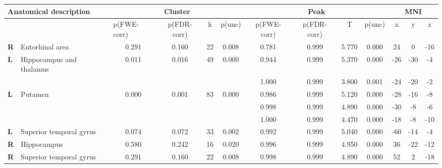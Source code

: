 \begin{landscape}
\begin{table}[!ht]
    \vspace*{-4cm}
    \raggedright
\begin{tabular}{ll|cccc|cccc|ccc} \\ \hline
        \multicolumn{2}{l}{\textbf{Anatomical description}} & \multicolumn{4}{c}{\textbf{Cluster}} & \multicolumn{4}{c}{\textbf{Peak}} &  \multicolumn{3}{c}{\textbf{MNI}} \\ \hline
        \multicolumn{2}{l}{\textbf{}} & \multicolumn{1}{l}{p(FWE-corr)} & p(FDR-corr) & k & \multicolumn{1}{l}{p(unc)} & p(FWE-corr) & p(FDR-corr) & T & \multicolumn{1}{l}{p(unc)} & x & y & z \\ \hline
        \textbf{R} & Entorhinal area & 0.291 & 0.160 & 22 & 0.008 & 0.781 & 0.999 & 5.770 & 0.000 & 24 & 0 & -16 \\
        \textbf{L} & Hippocampus and thalamus & 0.011 & 0.016 & 49 & 0.000 & 0.944 & 0.999 & 5.370 & 0.000 & -26 & -30 & -4 \\
        \textbf{} &                  &       &       &     &       & 1.000 & 0.999 & 3.800 & 0.001 & -24 & -20 & -2 \\
        \textbf{L} & Putamen & 0.000 & 0.001 & 83 & 0.000 & 0.986 & 0.999 & 5.120 & 0.000 & -28 & -16 & -8 \\
        \textbf{} & &       &       &     &       & 0.998 & 0.999 & 4.890 & 0.000 & -30 & -8 & -6 \\
        \textbf{} & &       &       &     &       & 1.000 & 0.999 & 4.470 & 0.000 & -18 & -8 & -10 \\
        \textbf{L} & Superior temporal gyrus & 0.074 & 0.072 & 33 & 0.002 & 0.992 & 0.999 & 5.040 & 0.000 & -60 & -14 & -4 \\
        \textbf{R} & Hippocampus & 0.580 & 0.242 & 16 & 0.020 & 0.996 & 0.999 & 4.950 & 0.000 & 36 & -22 & -12 \\
        \textbf{R} & Superior temporal gyrus & 0.291 & 0.160 & 22 & 0.008 & 0.998 & 0.999 & 4.890 & 0.000 & 52 & 2 & -18 \\

\end{tabular}
\end{table}
\end{landscape}
